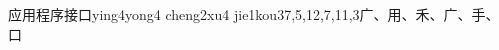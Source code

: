 \begin{EntryWithPhonetic}{应用程序接口}{ying4yong4 cheng2xu4 jie1kou3}{7,5,12,7,11,3}{⼴、⽤、⽲、⼴、⼿、⼝}
\end{EntryWithPhonetic}

